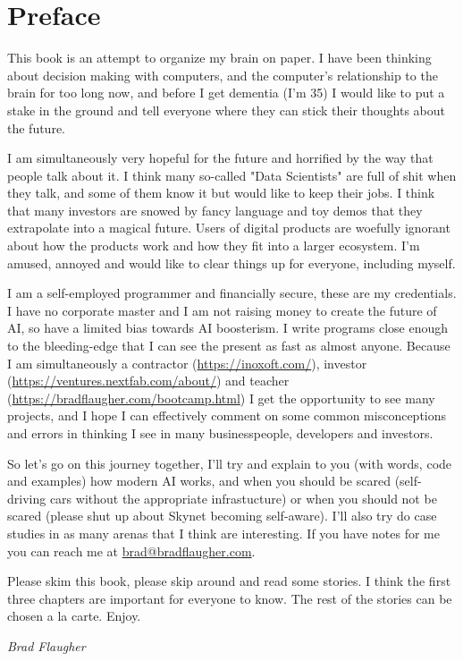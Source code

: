 \chapter*{Preface}

This book is an attempt to organize my brain on paper. I have been thinking about decision making with computers, and the computer's relationship to the brain for too long now, and before I get dementia (I'm 35) I would like to put a stake in the ground and tell everyone where they can stick their thoughts about the future. 

I am simultaneously very hopeful for the future and horrified by the way that people talk about it. I think many so-called "Data Scientists" are full of shit when they talk, and some of them know it but would like to keep their jobs. I think that many investors are snowed by fancy language and toy demos that they extrapolate into a magical future. Users of digital products are woefully ignorant about how the products work and how they fit into a larger ecosystem. I'm amused, annoyed and would like to clear things up for everyone, including myself.

I am a self-employed programmer and financially secure, these are my credentials. I have no corporate master and I am not raising money to create the future of AI, so have a limited bias towards AI boosterism. I write programs close enough to the bleeding-edge that I can see the present as fast as almost anyone. Because I am simultaneously a contractor (\url{https://inoxoft.com/}), investor (\url{https://ventures.nextfab.com/about/}) and teacher (\url{https://bradflaugher.com/bootcamp.html}) I get the opportunity to see many projects, and I hope I can effectively comment on some common misconceptions and errors in thinking I see in many businesspeople, developers and investors.

So let's go on this journey together, I'll try and explain to you (with words, code and examples) how modern AI works, and when you should be scared (self-driving cars without the appropriate infrastucture) or when you should not be scared (please shut up about Skynet becoming self-aware). I'll also try do case studies in as many arenas that I think are interesting. If you have notes for me you can reach me at \href{mailto:brad@bradflaugher.com}{brad@bradflaugher.com}.

Please skim this book, please skip around and read some stories. I think the first three chapters are important for everyone to know. The rest of the stories can be chosen a la carte. Enjoy.

\begin{flushright}
	\textit{Brad Flaugher}
\end{flushright}
